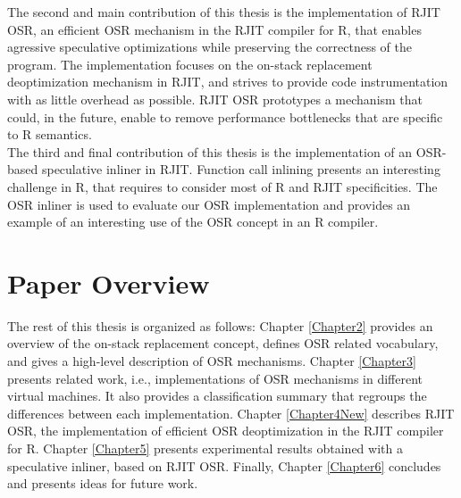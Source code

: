 The second and main contribution of this thesis is the implementation of RJIT OSR, an efficient OSR mechanism in the RJIT compiler for R, that enables agressive speculative optimizations while preserving the correctness of the program.
The implementation focuses on the on-stack replacement deoptimization mechanism in RJIT, and strives to provide code instrumentation with as little overhead as possible.
RJIT OSR prototypes a mechanism that could, in the future, enable to remove performance bottlenecks that are specific to R semantics.\\

The third and final contribution of this thesis is the implementation of an OSR-based speculative inliner in RJIT.
Function call inlining presents an interesting challenge in R, that requires to consider most of R and RJIT specificities.
The OSR inliner is used to evaluate our OSR implementation and provides an example of an interesting use of the OSR concept in an R compiler.\\

\section{Paper Overview}

The rest of this thesis is organized as follows: Chapter \ref{Chapter2} provides an overview of the on-stack replacement concept, defines OSR related vocabulary, and gives a high-level description of OSR mechanisms.
Chapter \ref{Chapter3} presents related work, i.e., implementations of OSR mechanisms in different virtual machines. It also provides a classification summary that regroups the differences between each implementation.
Chapter \ref{Chapter4New} describes RJIT OSR, the implementation of efficient OSR deoptimization in the RJIT compiler for R.
Chapter \ref{Chapter5} presents experimental results obtained with a speculative inliner, based on RJIT OSR.
Finally, Chapter \ref{Chapter6} concludes and presents ideas for future work.\\ 





